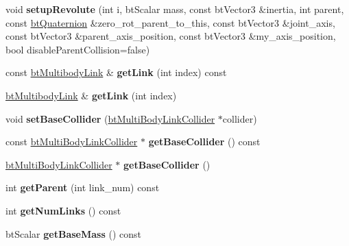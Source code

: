 \begin{DoxyCompactItemize}
\mbox{\label{classbtMultiBody_a90726123e71ab232653365aa4ef3d18b}} 
void {\bfseries setup\+Revolute} (int i, bt\+Scalar mass, const bt\+Vector3 \&inertia, int parent, const \hyperlink{classbtQuaternion}{bt\+Quaternion} \&zero\+\_\+rot\+\_\+parent\+\_\+to\+\_\+this, const bt\+Vector3 \&joint\+\_\+axis, const bt\+Vector3 \&parent\+\_\+axis\+\_\+position, const bt\+Vector3 \&my\+\_\+axis\+\_\+position, bool disable\+Parent\+Collision=false)
\item 
\mbox{\label{classbtMultiBody_a9527f50e23482689fb658d48b54e8c9c}} 
const \hyperlink{structbtMultibodyLink}{bt\+Multibody\+Link} \& {\bfseries get\+Link} (int index) const
\item 
\mbox{\label{classbtMultiBody_a780d83915c460c1a17f098d47b2c8df2}} 
\hyperlink{structbtMultibodyLink}{bt\+Multibody\+Link} \& {\bfseries get\+Link} (int index)
\item 
\mbox{\label{classbtMultiBody_afe617a7ba5ab8538212ed9019721ee34}} 
void {\bfseries set\+Base\+Collider} (\hyperlink{classbtMultiBodyLinkCollider}{bt\+Multi\+Body\+Link\+Collider} $\ast$collider)
\item 
\mbox{\label{classbtMultiBody_ac4572e67ecbf703363dc6f0216255799}} 
const \hyperlink{classbtMultiBodyLinkCollider}{bt\+Multi\+Body\+Link\+Collider} $\ast$ {\bfseries get\+Base\+Collider} () const
\item 
\mbox{\label{classbtMultiBody_a8553158acf5059cba677db783dc03ecd}} 
\hyperlink{classbtMultiBodyLinkCollider}{bt\+Multi\+Body\+Link\+Collider} $\ast$ {\bfseries get\+Base\+Collider} ()
\item 
\mbox{\label{classbtMultiBody_a898364731e99c7c24b9be8c92806f775}} 
int {\bfseries get\+Parent} (int link\+\_\+num) const
\item 
\mbox{\label{classbtMultiBody_a5d1e7ab2bfb03be026ab42d8ad53ec8f}} 
int {\bfseries get\+Num\+Links} () const
\item 
\mbox{\label{classbtMultiBody_acc628f4906d360d7b09caa0a5d6e4ee9}} 
bt\+Scalar {\bfseries get\+Base\+Mass} () const

\end{DoxyCompactItemize}
